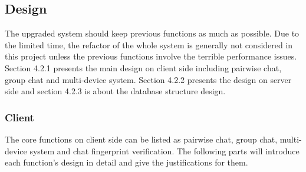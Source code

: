 \subsection{Design}
The upgraded system should keep previous functions as much as possible. Due to the limited time, the refactor of the whole system is generally not considered in this project unless the previous functions involve the terrible performance issues. Section 4.2.1 presents the main design on client side including pairwise chat, group chat and multi-device system. Section 4.2.2 presents the design on server side and section 4.2.3 is about the database structure design.
\subsubsection{Client}
The core functions on client side can be listed as pairwise chat, group chat, multi-device system and chat fingerprint verification. The following parts will introduce each function's design in detail and give the justifications for them.

